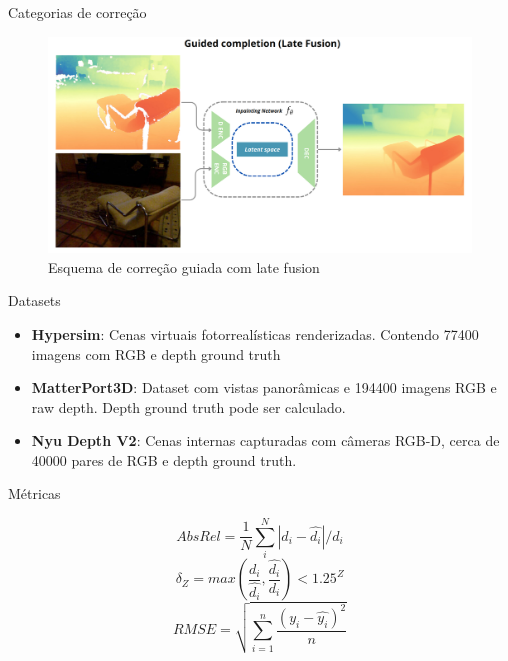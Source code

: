 \documentclass[aspectratio=169]{beamer}
\begin{document}
\begin{frame}{Categorias de correção}

\begin{figure}
    \centering
    \includegraphics[width=\textwidth]{figs/latefusion1.png}
    \caption{Esquema de correção guiada com late fusion}
    \label{fig:enter-label}
\end{figure}
    
\end{frame}




\begin{frame}{Datasets}

\begin{itemize}
    \item \textbf{Hypersim}: Cenas virtuais fotorrealísticas renderizadas. Contendo 77400 imagens com RGB e depth ground truth 
    \item \textbf{MatterPort3D}: Dataset com vistas panorâmicas e 194400 imagens RGB e raw depth. Depth ground truth pode ser calculado. 
    \item \textbf{Nyu Depth V2}: Cenas internas capturadas com câmeras RGB-D, cerca de 40000 pares de RGB e depth ground truth.
\end{itemize}
    
\end{frame}




\begin{frame}{Métricas}

 
   $$ Abs Rel = \frac{1}{N} \sum_{i}^{N} \left |  d_i - \hat{d_i}\right | / \hat{d_i}$$
   $$ \delta_Z = max (\frac{d_i}{\hat{d_i}} , \frac{\hat{d_i}}{d_i}) < 1.25^Z $$
   $$ RMSE = \sqrt{\sum_{i=1}^{n}\frac{(y_i - \hat{y_i})^2}{n}}$$

\end{frame}
\end{document}
